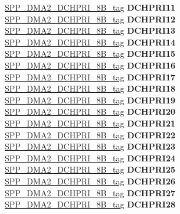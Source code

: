 \begin{DoxyCompactItemize}
\begin{tabbing}
\>\>\mbox{\hyperlink{unionSPP__DMA2__DCHPRI__8B__tag}{SPP\_DMA2\_DCHPRI\_8B\_tag}} {\bfseries DCHPRI11}\\
\>\>\mbox{\hyperlink{unionSPP__DMA2__DCHPRI__8B__tag}{SPP\_DMA2\_DCHPRI\_8B\_tag}} {\bfseries DCHPRI12}\\
\>\>\mbox{\hyperlink{unionSPP__DMA2__DCHPRI__8B__tag}{SPP\_DMA2\_DCHPRI\_8B\_tag}} {\bfseries DCHPRI13}\\
\>\>\mbox{\hyperlink{unionSPP__DMA2__DCHPRI__8B__tag}{SPP\_DMA2\_DCHPRI\_8B\_tag}} {\bfseries DCHPRI14}\\
\>\>\mbox{\hyperlink{unionSPP__DMA2__DCHPRI__8B__tag}{SPP\_DMA2\_DCHPRI\_8B\_tag}} {\bfseries DCHPRI15}\\
\>\>\mbox{\hyperlink{unionSPP__DMA2__DCHPRI__8B__tag}{SPP\_DMA2\_DCHPRI\_8B\_tag}} {\bfseries DCHPRI16}\\
\>\>\mbox{\hyperlink{unionSPP__DMA2__DCHPRI__8B__tag}{SPP\_DMA2\_DCHPRI\_8B\_tag}} {\bfseries DCHPRI17}\\
\>\>\mbox{\hyperlink{unionSPP__DMA2__DCHPRI__8B__tag}{SPP\_DMA2\_DCHPRI\_8B\_tag}} {\bfseries DCHPRI18}\\
\>\>\mbox{\hyperlink{unionSPP__DMA2__DCHPRI__8B__tag}{SPP\_DMA2\_DCHPRI\_8B\_tag}} {\bfseries DCHPRI19}\\
\>\>\mbox{\hyperlink{unionSPP__DMA2__DCHPRI__8B__tag}{SPP\_DMA2\_DCHPRI\_8B\_tag}} {\bfseries DCHPRI20}\\
\>\>\mbox{\hyperlink{unionSPP__DMA2__DCHPRI__8B__tag}{SPP\_DMA2\_DCHPRI\_8B\_tag}} {\bfseries DCHPRI21}\\
\>\>\mbox{\hyperlink{unionSPP__DMA2__DCHPRI__8B__tag}{SPP\_DMA2\_DCHPRI\_8B\_tag}} {\bfseries DCHPRI22}\\
\>\>\mbox{\hyperlink{unionSPP__DMA2__DCHPRI__8B__tag}{SPP\_DMA2\_DCHPRI\_8B\_tag}} {\bfseries DCHPRI23}\\
\>\>\mbox{\hyperlink{unionSPP__DMA2__DCHPRI__8B__tag}{SPP\_DMA2\_DCHPRI\_8B\_tag}} {\bfseries DCHPRI24}\\
\>\>\mbox{\hyperlink{unionSPP__DMA2__DCHPRI__8B__tag}{SPP\_DMA2\_DCHPRI\_8B\_tag}} {\bfseries DCHPRI25}\\
\>\>\mbox{\hyperlink{unionSPP__DMA2__DCHPRI__8B__tag}{SPP\_DMA2\_DCHPRI\_8B\_tag}} {\bfseries DCHPRI26}\\
\>\>\mbox{\hyperlink{unionSPP__DMA2__DCHPRI__8B__tag}{SPP\_DMA2\_DCHPRI\_8B\_tag}} {\bfseries DCHPRI27}\\
\>\>\mbox{\hyperlink{unionSPP__DMA2__DCHPRI__8B__tag}{SPP\_DMA2\_DCHPRI\_8B\_tag}} {\bfseries DCHPRI28}\\

\end{tabbing}
\end{DoxyCompactItemize}
